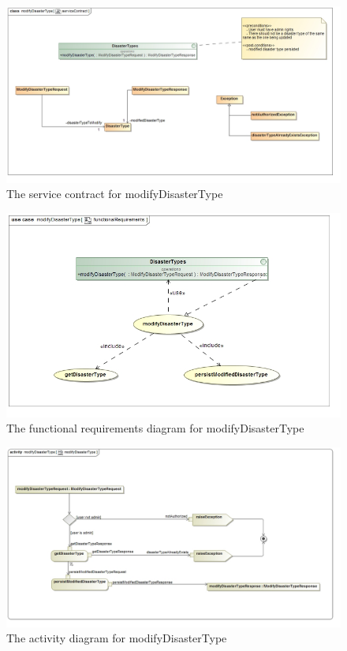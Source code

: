 \begin{figure}[H]
	\centering
	\includegraphics[width=1.0\textwidth]{../images/funcReq/modifyDisasterTypeServiceContract.jpg}
	\caption{The service contract for modifyDisasterType \label{overflow}}
\end{figure}

\begin{figure}[H]
	\centering
	\includegraphics[width=1.0\textwidth]{../images/funcReq/modifyDisasterTypeFunctionalRequirements.jpg}
	\caption{The functional requirements diagram for modifyDisasterType \label{overflow}}
\end{figure}

\begin{figure}[H]
	\centering
	\includegraphics[width=1.0\textwidth]{../images/funcReq/modifyDisasterTypeActivityDiagram.jpg}
	\caption{The activity diagram for modifyDisasterType \label{overflow}}
\end{figure}